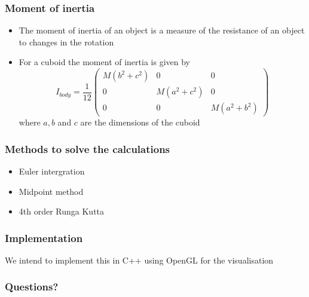 \documentclass{beamer}
\begin{document}
\begin{frame}
 \frametitle{Moment of inertia}
 \begin{itemize}
  \item 
  The moment of inertia of an object is a measure of the resistance of an object to changes in the rotation

  \item
  For a cuboid the moment of inertia is given by
  \begin{displaymath}
    I_{body} = \frac{1}{12} \begin{pmatrix}
			    M(b^2 + c^2) & 0 & 0 \\
			    0 & M(a^2 + c^2) & 0 \\
			    0 & 0 & M(a^2 + b^2)
			    \end{pmatrix}
  \end{displaymath}
  where $a, b$ and $c$ are the dimensions of the cuboid
 \end{itemize}
\end{frame}

\begin{frame}
 \frametitle{Methods to solve the calculations}
 \begin{itemize}
  \item Euler intergration
  \item Midpoint method
  \item 4th order Runga Kutta
 \end{itemize}
\end{frame}

\begin{frame}
 \frametitle{Implementation}
 We intend to implement this in C++ using OpenGL for the visualisation
\end{frame}

 \begin{frame}
  \frametitle{Questions?}
 \end{frame}
\end{document}
